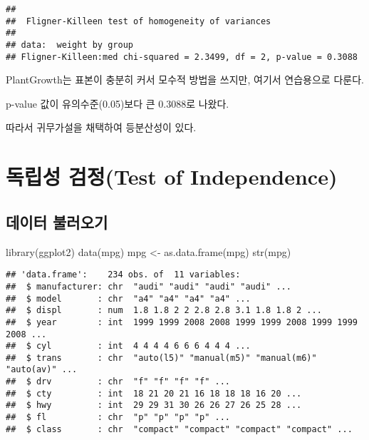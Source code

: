 \documentclass[
]{article}
\newenvironment{Shaded}{\begin{snugshade}}{\end{snugshade}}
\newcommand{\FunctionTok}[1]{\textcolor[rgb]{0.00,0.00,0.00}{#1}}
\newcommand{\NormalTok}[1]{#1}
\newcommand{\OtherTok}[1]{\textcolor[rgb]{0.56,0.35,0.01}{#1}}
\begin{document}
\begin{verbatim}
## 
##  Fligner-Killeen test of homogeneity of variances
## 
## data:  weight by group
## Fligner-Killeen:med chi-squared = 2.3499, df = 2, p-value = 0.3088
\end{verbatim}

PlantGrowth는 표본이 충분히 커서 모수적 방법을 쓰지만, 여기서 연습용으로 다룬다.

p-value 값이 유의수준(0.05)보다 큰 0.3088로 나왔다.

따라서 귀무가설을 채택하여 등분산성이 있다.

\hypertarget{uxb3c5uxb9bduxc131-uxac80uxc815test-of-independence}{%
\section{독립성 검정(Test of Independence)}\label{uxb3c5uxb9bduxc131-uxac80uxc815test-of-independence}}

\hypertarget{uxb370uxc774uxd130-uxbd88uxb7ecuxc624uxae30-2}{%
\subsection{데이터 불러오기}\label{uxb370uxc774uxd130-uxbd88uxb7ecuxc624uxae30-2}}

\begin{Shaded}
\begin{Highlighting}[]
\FunctionTok{library}\NormalTok{(ggplot2)}
\FunctionTok{data}\NormalTok{(mpg)}
\NormalTok{mpg }\OtherTok{\textless{}{-}} \FunctionTok{as.data.frame}\NormalTok{(mpg)}
\FunctionTok{str}\NormalTok{(mpg)}
\end{Highlighting}
\end{Shaded}

\begin{verbatim}
## 'data.frame':    234 obs. of  11 variables:
##  $ manufacturer: chr  "audi" "audi" "audi" "audi" ...
##  $ model       : chr  "a4" "a4" "a4" "a4" ...
##  $ displ       : num  1.8 1.8 2 2 2.8 2.8 3.1 1.8 1.8 2 ...
##  $ year        : int  1999 1999 2008 2008 1999 1999 2008 1999 1999 2008 ...
##  $ cyl         : int  4 4 4 4 6 6 6 4 4 4 ...
##  $ trans       : chr  "auto(l5)" "manual(m5)" "manual(m6)" "auto(av)" ...
##  $ drv         : chr  "f" "f" "f" "f" ...
##  $ cty         : int  18 21 20 21 16 18 18 18 16 20 ...
##  $ hwy         : int  29 29 31 30 26 26 27 26 25 28 ...
##  $ fl          : chr  "p" "p" "p" "p" ...
##  $ class       : chr  "compact" "compact" "compact" "compact" ...
\end{verbatim}
\end{document}
